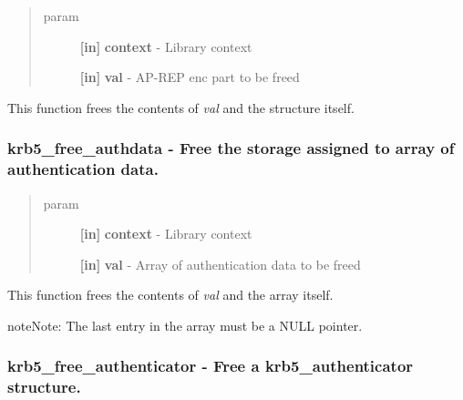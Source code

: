 \documentclass[letterpaper,10pt,english]{sphinxmanual}
\begin{document}
\begin{quote}\begin{description}
\item[{param}] \leavevmode
\textbf{{[}in{]}} \textbf{context} - Library context

\textbf{{[}in{]}} \textbf{val} - AP-REP enc part to be freed

\end{description}\end{quote}

This function frees the contents of \emph{val} and the structure itself.


\subsubsection{krb5\_free\_authdata -  Free the storage assigned to array of authentication data.}
\label{appdev/refs/api/krb5_free_authdata::doc}\label{appdev/refs/api/krb5_free_authdata:krb5-free-authdata-free-the-storage-assigned-to-array-of-authentication-data}

\begin{fulllineitems}
\label{appdev/refs/api/krb5_free_authdata:c.krb5_free_authdata}
\end{fulllineitems}

\begin{quote}\begin{description}
\item[{param}] \leavevmode
\textbf{{[}in{]}} \textbf{context} - Library context

\textbf{{[}in{]}} \textbf{val} - Array of authentication data to be freed

\end{description}\end{quote}

This function frees the contents of \emph{val} and the array itself.

\begin{notice}{note}{Note:}
The last entry in the array must be a NULL pointer.
\end{notice}


\subsubsection{krb5\_free\_authenticator -  Free a krb5\_authenticator structure.}
\label{appdev/refs/api/krb5_free_authenticator:krb5-free-authenticator-free-a-krb5-authenticator-structure}\label{appdev/refs/api/krb5_free_authenticator::doc}
\end{document}
